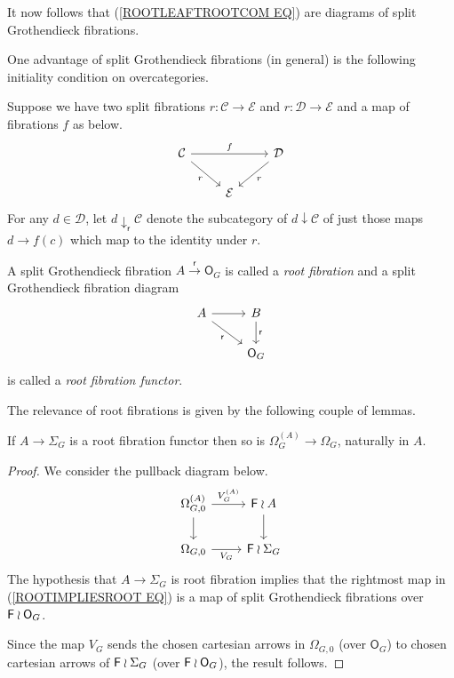 \documentclass[a4paper,10pt]{article}%
\begin{document}
It now follows that (\ref{ROOTLEAFTROOTCOM EQ}) are diagrams of split Grothendieck fibrations.

One advantage of split Grothendieck fibrations (in general) is the following initiality condition on overcategories.
\begin{definition}
  Suppose we have two split fibrations $r: \mathcal C \to \mathcal E$ and $r: \mathcal D \to \mathcal E$ and a map of fibrations $f$ as below.
  \[
  \begin{tikzcd}
    \mathcal C \arrow[dr, "r"'] \arrow[rr, "f"] & & \mathcal D \arrow[dl, "r"]\\
    &     \mathcal E
  \end{tikzcd}
  \]  
  For any $d\in \mathcal D$, let $d \downarrow_{\mathsf r}\mathcal C$ denote the subcategory of $d\downarrow \mathcal C$ of just those maps $d \to f(c)$ which map to the identity under $r$.
\end{definition}



\begin{definition}
A split Grothendieck fibration 
$A \xrightarrow{\mathsf{r}} \mathsf{O}_G$
is called a \textit{root fibration} and a split Grothendieck fibration diagram
\[
\begin{tikzcd}
	A \ar{r} \ar{rd}[swap]{\mathsf{r}}&
	B \ar{d}{\mathsf{r}} 
\\
	& \mathsf{O}_G 
\end{tikzcd}
\]
is called a \textit{root fibration functor}.
\end{definition}


The relevance of root fibrations is given by the following couple of lemmas.

\begin{lemma}\label{ROOTFIBPULL LEM}
If $A \to \Sigma_G$ is a root fibration functor then so is 
$\Omega_G^{(A)} \to \Omega_G$, naturally in $A$.
\end{lemma}


\begin{proof}
We consider the pullback diagram below.
\begin{equation}\label{ROOTIMPLIESROOT EQ}
\begin{tikzcd}
	\Omega_{G,0}^{(A)} \ar{r}{V_G^{(A)}} \ar{d} &
	\Fin \wr A \ar{d}
\\
	\Omega_{G,0} \ar{r}[swap]{V_G} &
	\Fin \wr \Sigma_G
\end{tikzcd}
\end{equation}
The hypothesis that $A \to \Sigma_G$ is root fibration 
implies that the rightmost map in (\ref{ROOTIMPLIESROOT EQ})
is a map of split Grothendieck fibrations over
$\mathsf{F} \wr \mathsf{O}_G$.

Since the map $V_G$ sends the chosen cartesian arrows in $\Omega_{G,0}$
(over $\mathsf{O}_G$) to chosen cartesian arrows of $\mathsf{F} \wr \Sigma_G$ (over $\mathsf{F} \wr \mathsf{O}_G$), the result follows.
\end{proof}
\end{document}
